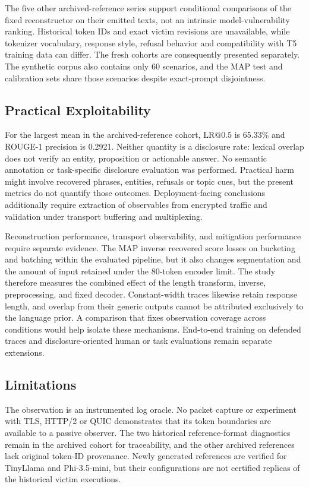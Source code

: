 \documentclass[electronics,article,submit,pdftex,moreauthors]{Definitions/mdpi}
\begin{document}
The five other archived-reference series support conditional comparisons of the fixed reconstructor on their emitted texts, not an intrinsic model-vulnerability ranking. Historical token IDs and exact victim revisions are unavailable, while tokenizer vocabulary, response style, refusal behavior and compatibility with T5 training data can differ. The fresh cohorts are consequently presented separately. The synthetic corpus also contains only 60 scenarios, and the MAP test and calibration sets share those scenarios despite exact-prompt disjointness.

\subsection{Practical Exploitability}
For the largest mean in the archived-reference cohort, $\mathrm{LR}@0.5$ is 65.33\% and ROUGE-1 precision is 0.2921. Neither quantity is a disclosure rate: lexical overlap does not verify an entity, proposition or actionable answer. No semantic annotation or task-specific disclosure evaluation was performed. Practical harm might involve recovered phrases, entities, refusals or topic cues, but the present metrics do not quantify those outcomes. Deployment-facing conclusions additionally require extraction of observables from encrypted traffic and validation under transport buffering and multiplexing.

Reconstruction performance, transport observability, and mitigation performance require separate evidence. The MAP inverse recovered score losses on bucketing and batching within the evaluated pipeline, but it also changes segmentation and the amount of input retained under the 80-token encoder limit. The study therefore measures the combined effect of the length transform, inverse, preprocessing, and fixed decoder. Constant-width traces likewise retain response length, and overlap from their generic outputs cannot be attributed exclusively to the language prior. A comparison that fixes observation coverage across conditions would help isolate these mechanisms. End-to-end training on defended traces and disclosure-oriented human or task evaluations remain separate extensions.

\subsection{Limitations}
The observation is an instrumented log oracle. No packet capture or experiment with TLS, HTTP/2 or QUIC demonstrates that its token boundaries are available to a passive observer. The two historical reference-format diagnostics remain in the archived cohort for traceability, and the other archived references lack original token-ID provenance. Newly generated references are verified for TinyLlama and Phi-3.5-mini, but their configurations are not certified replicas of the historical victim executions.
\end{document}
